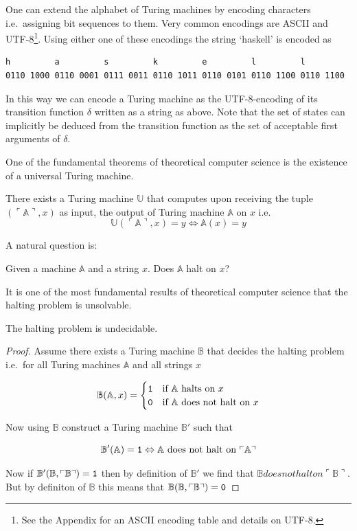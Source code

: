 One can extend the alphabet of Turing machines by encoding characters
i.e.~assigning bit sequences to them. Very common encodings are
\textsc{ASCII} and \textsc{UTF-8}\footnote{See the Appendix for an
  \textsc{ASCII} encoding table and details on \textsc{UTF-8}.}. Using
either one of these encodings the string `haskell' is encoded as

\begin{lstlisting}
h         a         s         k         e         l         l
0110 1000 0110 0001 0111 0011 0110 1011 0110 0101 0110 1100 0110 1100
\end{lstlisting}

In this way we can encode a Turing machine as the \textsc{UTF-8}-encoding of
its transition function $δ$ written as a string as above. Note that
the set of states can implicitly be deduced from the transition function
as the set of acceptable first arguments of $δ$.

One of the fundamental theorems of theoretical computer science is the
existence of a universal Turing machine.

\begin{thm}
    There exists a Turing machine $\mathbb U$ that computes upon receiving
    the tuple $(\ulcorner \mathbb A \urcorner, x)$ as input, the output of
    Turing machine $\mathbb A$ on $x$ i.e.
    \[ \mathbb U(\ulcorner \mathbb A \urcorner, x) = y \Leftrightarrow \mathbb A (x) = y\]
\end{thm}

A natural question is:

Given a machine $\mathbb A$ and a string $x$. Does $\mathbb A$
halt on $x$?

It is one of the most fundamental results of theoretical computer
science that the halting problem is unsolvable.

\begin{thm}
    The halting problem is undecidable.
\end{thm}
\begin{proof}
    Assume there exists a Turing machine $\mathbb B$ that decides the
    halting problem i.e.~for all Turing machines $\mathbb A$ and all
    strings $x$
    
    \[ \mathbb B(\mathbb A, x) =
    \begin{cases}
      \mathtt 1  & \text{if } \mathbb A \text{ halts on } x\\
      \mathtt 0  & \text{if } \mathbb A \text{ does not halt on } x
    \end{cases}\]
    
    Now using $\mathbb B$ construct a Turing machine $\mathbb B'$ such
    that
    
    \[ \mathbb B'(\mathbb A) = \mathtt 1 \Leftrightarrow \mathbb A \text{ does not halt on } \ulcorner \mathbb A\urcorner \]
    
    Now if $\mathbb B'(\mathbb B, \ulcorner \mathbb B\urcorner) = \mathtt 1$
    then by definition of $\mathbb B'$ we find that
    $\mathbb B does not halt on \ulcorner \mathbb B\urcorner$. But by
    definiton of $\mathbb B$ this means that
    $\mathbb B(\mathbb B, \ulcorner \mathbb B \urcorner) = \mathtt 0$
\end{proof}
